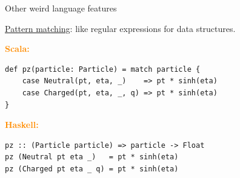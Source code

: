 \documentclass[aspectratio=169]{beamer}
\begin{document}

\begin{frame}[fragile]{Other weird language features}
\Large
\vspace{0.5 cm}

\underline{Pattern matching}: like regular expressions for data structures.

\vspace{0.5 cm}
\textcolor{darkorange}{\bf Scala:}

\begin{center}
\begin{minipage}{0.85\linewidth}
\normalsize
\begin{verbatim}
def pz(particle: Particle) = match particle {
    case Neutral(pt, eta, _)    => pt * sinh(eta)
    case Charged(pt, eta, _, q) => pt * sinh(eta)
}
\end{verbatim}
\end{minipage}
\end{center}

\vspace{0.5 cm}
\textcolor{darkorange}{\bf Haskell:}

\begin{center}
\begin{minipage}{0.85\linewidth}
\normalsize
\begin{verbatim}
pz :: (Particle particle) => particle -> Float
pz (Neutral pt eta _)   = pt * sinh(eta)
pz (Charged pt eta _ q) = pt * sinh(eta)
\end{verbatim}
\end{minipage}
\end{center}
\end{frame}
\end{document}
